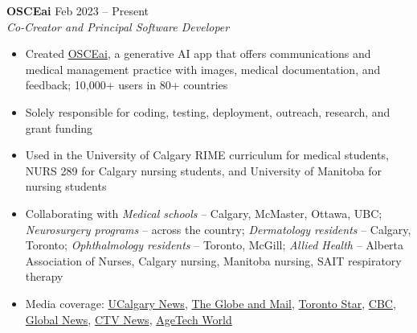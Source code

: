 \documentclass{article}
\begin{document}
\textbf{OSCEai} \hfill Feb 2023 -- Present \\
\textit{Co-Creator and Principal Software Developer}
\begin{itemize}
    \item Created \href{https://osceai.ca/}{OSCEai}, a generative AI app that offers communications and medical management practice with images, medical documentation, and feedback; 10,000+ users in 80+ countries
    \item Solely responsible for coding, testing, deployment, outreach, research, and grant funding
    \item Used in the University of Calgary RIME curriculum for medical students, NURS 289 for Calgary nursing students, and University of Manitoba for nursing students
    \item Collaborating with \textit{Medical schools} -- Calgary, McMaster, Ottawa, UBC; \textit{Neurosurgery programs} -- across the country; \textit{Dermatology residents} -- Calgary, Toronto; \textit{Ophthalmology residents} -- Toronto, McGill; \textit{Allied Health} -- Alberta Association of Nurses, Calgary nursing, Manitoba nursing, SAIT respiratory therapy
    \item Media coverage: \href{https://cumming.ucalgary.ca/news/ucalgary-students-create-app-help-medical-students-learn-how-talk-patients}{UCalgary News}, \href{https://www.theglobeandmail.com/canada/alberta/article-new-app-uses-ai-to-help-calgary-medical-students-practise-interacting/}{The Globe and Mail}, \href{https://www.thestar.com/news/canada/new-app-uses-ai-to-help-calgary-medical-students-practise-interacting-with-patients/article_e24a869c-58f4-58ee-99ea-666e2bc65f27.amp.html}{Toronto Star}, \href{https://www.cbc.ca/amp/1.6975645}{CBC}, \href{https://globalnews.ca/news/9978614/new-app-uses-ai-medical-students-practise-interacting-patients/}{Global News}, \href{https://calgary.ctvnews.ca/new-app-uses-ai-to-help-calgary-medical-students-practise-interacting-with-patients-1.6573065?utm_source=ground.news&utm_medium=referral}{CTV News}, \href{https://agetechworld-co-uk.cdn.ampproject.org/c/s/agetechworld.co.uk/news/new-ai-app-could-hold-key-to-better-older-patient-doctor-communication/?amp=1}{AgeTech World}
\end{itemize} \vspace{1em}
\end{document}
